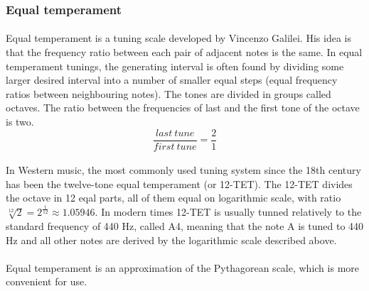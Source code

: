 \documentclass[]{article}
\begin{document}
            \subsubsection{Equal temperament}
            \paragraph{}Equal temperament is a tuning scale developed by Vincenzo Galilei. His idea is that the frequency ratio between each pair of adjacent notes is the same. In equal temperament tunings, the generating interval is often found by dividing some larger desired interval into a number of smaller equal steps (equal frequency ratios between neighbouring notes). The tones are divided in groups called octaves. The ratio between the frequencies of last and the first tone of the octave is two.
                $$\frac{last\ tune}{first\ tune} = \frac{2}{1}$$ \paragraph{}
                In Western music, the most commonly used tuning system since the 18th century has been the twelve-tone equal temperament (or 12-TET)\cite{12tet}. The 12-TET divides the octave in 12 eqal parts, all of them equal on logarithmic scale, with ratio $\sqrt[12]{2} = 2^\frac{1}{12} \approx 1.05946$. In modern times 12-TET is usually tunned relatively to the standard frequency of 440 Hz, called A4, meaning that the note A is tuned to 440 Hz and all other notes are derived by the logarithmic scale described above. \paragraph{}
                Equal temperament is an approximation of the Pythagorean scale, which is more convenient for use.\\
\end{document}
